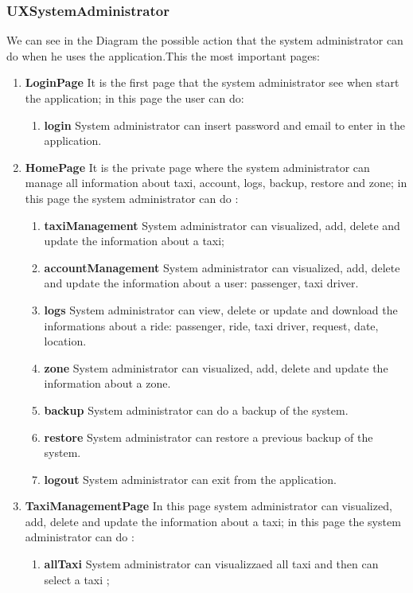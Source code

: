 \documentclass[11pt, a4paper,titlepage]{article}
\begin{document}
	\subsubsection{UXSystemAdministrator}
	We can see in the Diagram the possible action that the system administrator can do when he uses the application.This the most important pages:
	\begin{enumerate}
		\item \textbf{LoginPage} It is the first page that the system administrator see when start the application; in this page the user can do:
		\begin{enumerate}
			\item \textbf{login} System administrator can insert password and email to enter in the application.
		\end{enumerate}
		\item \textbf{HomePage} It is the private page where the system administrator can manage all information about taxi, account, logs, backup, restore and zone; in this page the system administrator can do :
		\begin{enumerate}
			\item \textbf{taxiManagement} System administrator can visualized, add, delete and update the information about a taxi;
			\item \textbf{accountManagement} System administrator can visualized, add, delete and update the information about a user: passenger, taxi driver.
			\item \textbf{logs} System administrator can view, delete or update and download the informations about a ride: passenger, ride, taxi driver, request, date, location.
			\item \textbf{zone} System administrator can visualized, add, delete and update the information about a zone.
			\item \textbf{backup} System administrator can do a backup of the system.
			\item \textbf{restore} System administrator can restore a previous backup of the system.
			\item \textbf{logout} System administrator can exit from the application.
		\end{enumerate}
		\item \textbf{TaxiManagementPage} In this page system administrator can  visualized, add, delete and update the information about a taxi; in this page the system  administrator can do :
		\begin{enumerate}
			\item \textbf{allTaxi} System administrator can visualizzaed all taxi and then can select a taxi ; 

\end{enumerate}
\end{enumerate}
\end{document}
